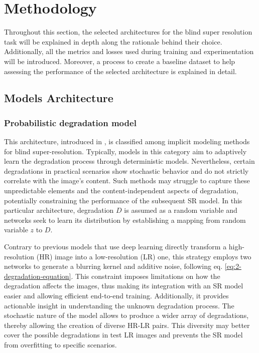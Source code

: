 \section{Methodology} \label{sec:methodology}

Throughout this section, the selected architectures for the blind super resolution task will be explained in depth along the rationale behind their choice. Additionally, all the metrics and losses used during training and experimentation will be introduced. 
Moreover, a process to create a baseline dataset to help assessing the performance of the selected architecture is explained in detail. 


\subsection{Models Architecture}

\subsubsection{Probabilistic degradation model}

    This architecture, introduced in \cite{luo2022learning}, is classified among implicit modeling methods for blind super-resolution.
    Typically, models in this category aim to adaptively learn the degradation process through deterministic models. Nevertheless, certain degradations in practical scenarios show stochastic behavior and do not strictly correlate with the image's content. Such methods may struggle to capture these unpredictable elements and the content-independent aspects of degradation, potentially constraining the performance of the subsequent SR model. In this particular architecture, degradation \(D\) is assumed as a random variable and networks seek to learn its distribution by establishing a mapping from random variable \(z\) to \(D\). 

    Contrary to previous models that use deep learning directly transform a high-resolution (HR) image into a low-resolution (LR) one, this strategy employs two networks to generate a blurring kernel and additive noise, following eq. \ref{eq:2-degradation-equation}. This constraint imposes limitations on how the degradation affects the images, thus making its integration with an SR model easier and allowing efficient end-to-end training. Additionally, it provides actionable insight in understanding the unknown degradation process.
    The stochastic nature of the model allows to produce a wider array of degradations, thereby allowing the creation of diverse HR-LR pairs. This diversity may better cover the possible degradations in test LR images and prevents the SR model from overfitting to specific scenarios.



